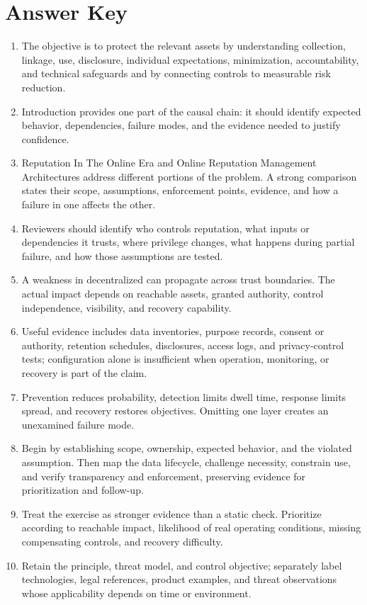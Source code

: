 \documentclass[11pt]{article}
\begin{document}
\section*{Answer Key}
\begin{enumerate}
\item The objective is to protect the relevant assets by understanding collection, linkage, use, disclosure, individual expectations, minimization, accountability, and technical safeguards and by connecting controls to measurable risk reduction.
\item Introduction provides one part of the causal chain: it should identify expected behavior, dependencies, failure modes, and the evidence needed to justify confidence.
\item Reputation In The Online Era and Online Reputation Management Architectures address different portions of the problem. A strong comparison states their scope, assumptions, enforcement points, evidence, and how a failure in one affects the other.
\item Reviewers should identify who controls reputation, what inputs or dependencies it trusts, where privilege changes, what happens during partial failure, and how those assumptions are tested.
\item A weakness in decentralized can propagate across trust boundaries. The actual impact depends on reachable assets, granted authority, control independence, visibility, and recovery capability.
\item Useful evidence includes data inventories, purpose records, consent or authority, retention schedules, disclosures, access logs, and privacy-control tests; configuration alone is insufficient when operation, monitoring, or recovery is part of the claim.
\item Prevention reduces probability, detection limits dwell time, response limits spread, and recovery restores objectives. Omitting one layer creates an unexamined failure mode.
\item Begin by establishing scope, ownership, expected behavior, and the violated assumption. Then map the data lifecycle, challenge necessity, constrain use, and verify transparency and enforcement, preserving evidence for prioritization and follow-up.
\item Treat the exercise as stronger evidence than a static check. Prioritize according to reachable impact, likelihood of real operating conditions, missing compensating controls, and recovery difficulty.
\item Retain the principle, threat model, and control objective; separately label technologies, legal references, product examples, and threat observations whose applicability depends on time or environment.
\end{enumerate}
\end{document}
